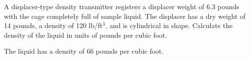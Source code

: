 

A displacer-type density transmitter registers a displacer weight of 6.3 pounds with the cage completely full of sample liquid.  The displacer has a dry weight of 14 pounds, a density of 120 lb/ft$^{3}$, and is cylindrical in shape.  Calculate the density of the liquid in units of pounds per cubic foot.







The liquid has a density of 66 pounds per cubic foot.











